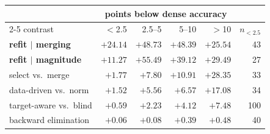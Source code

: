 \begin{tabular}{lrrrrr}
\toprule
& \multicolumn{4}{c}{points below dense accuracy} & \\
\cmidrule(lr){2-5}
contrast & $<$2.5 & 2.5--5 & 5--10 & $>$10 & $n_{<2.5}$\\
\midrule
\textbf{refit $\mid$ merging} & $+24.14$ & $+48.73$ & $+48.39$ & $+25.54$ & 43\\
\textbf{refit $\mid$ magnitude} & $+11.27$ & $+55.49$ & $+39.12$ & $+29.49$ & 27\\
select vs.\ merge & $+1.77$ & $+7.80$ & $+10.91$ & $+28.35$ & 33\\
data-driven vs.\ norm & $+1.52$ & $+5.56$ & $+6.57$ & $+17.08$ & 34\\
target-aware vs.\ blind & $+0.59$ & $+2.23$ & $+4.12$ & $+7.48$ & 100\\
backward elimination & $+0.06$ & $+0.08$ & $+0.39$ & $+0.48$ & 40\\
\bottomrule
\end{tabular}
